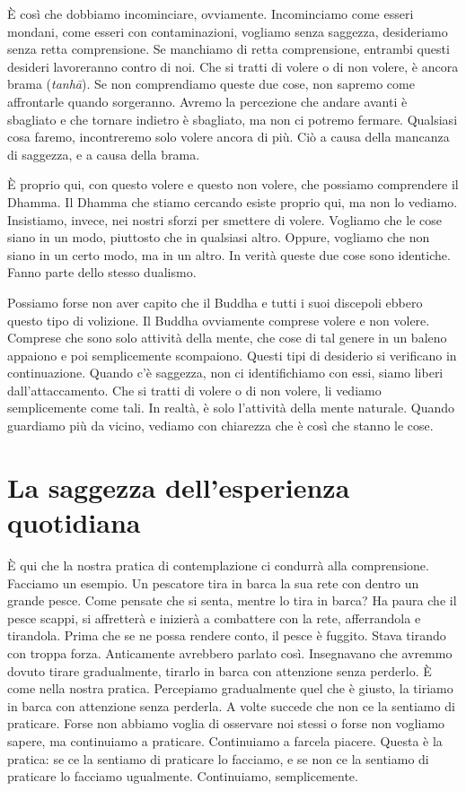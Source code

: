 È così che dobbiamo incominciare, ovviamente. Incominciamo come esseri
mondani, come esseri con contaminazioni, vogliamo senza saggezza,
desideriamo senza retta comprensione. Se manchiamo di retta
comprensione, entrambi questi desideri lavoreranno contro di noi. Che si
tratti di volere o di non volere, è ancora brama (\emph{tanhā}). Se non
comprendiamo queste due cose, non sapremo come affrontarle quando
sorgeranno. Avremo la percezione che andare avanti è sbagliato e che
tornare indietro è sbagliato, ma non ci potremo fermare. Qualsiasi cosa
faremo, incontreremo solo volere ancora di più. Ciò a causa della
mancanza di saggezza, e a causa della brama.

È proprio qui, con questo volere e questo non volere, che possiamo
comprendere il Dhamma. Il Dhamma che stiamo cercando esiste proprio qui,
ma non lo vediamo. Insistiamo, invece, nei nostri sforzi per smettere di
volere. Vogliamo che le cose siano in un modo, piuttosto che in
qualsiasi altro. Oppure, vogliamo che non siano in un certo modo, ma in
un altro. In verità queste due cose sono identiche. Fanno parte dello
stesso dualismo.

Possiamo forse non aver capito che il Buddha e tutti i suoi discepoli
ebbero questo tipo di volizione. Il Buddha ovviamente comprese volere e
non volere. Comprese che sono solo attività della mente, che cose di tal
genere in un baleno appaiono e poi semplicemente scompaiono. Questi tipi
di desiderio si verificano in continuazione. Quando c'è saggezza, non ci
identifichiamo con essi, siamo liberi dall'attaccamento. Che si tratti
di volere o di non volere, li vediamo semplicemente come tali. In
realtà, è solo l'attività della mente naturale. Quando guardiamo più da
vicino, vediamo con chiarezza che è così che stanno le cose.

\section{La saggezza dell'esperienza quotidiana}

È qui che la nostra pratica di contemplazione ci condurrà alla
comprensione. Facciamo un esempio. Un pescatore tira in barca la sua
rete con dentro un grande pesce. Come pensate che si senta, mentre lo
tira in barca? Ha paura che il pesce scappi, si affretterà e inizierà a
combattere con la rete, afferrandola e tirandola. Prima che se ne possa
rendere conto, il pesce è fuggito. Stava tirando con troppa forza.
Anticamente avrebbero parlato così. Insegnavano che avremmo dovuto
tirare gradualmente, tirarlo in barca con attenzione senza perderlo. È
come nella nostra pratica. Percepiamo gradualmente quel che è giusto, la
tiriamo in barca con attenzione senza perderla. A volte succede che non
ce la sentiamo di praticare. Forse non abbiamo voglia di osservare noi
stessi o forse non vogliamo sapere, ma continuiamo a praticare.
Continuiamo a farcela piacere. Questa è la pratica: se ce la sentiamo di
praticare lo facciamo, e se non ce la sentiamo di praticare lo facciamo
ugualmente. Continuiamo, semplicemente.

